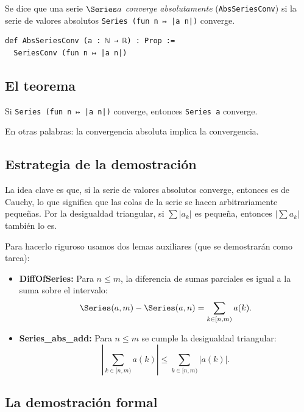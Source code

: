 Se dice que una serie $\Series a$ \emph{converge absolutamente} (\texttt{AbsSeriesConv}) si la serie de valores absolutos \texttt{Series (fun n ↦ |a n|)} converge.

\begin{verbatim}
def AbsSeriesConv (a : ℕ → ℝ) : Prop :=
  SeriesConv (fun n ↦ |a n|)
\end{verbatim}

\subsection{El teorema}

\begin{teorema}
Si \texttt{Series (fun n ↦ |a n|)} converge, entonces \texttt{Series a} converge.
\end{teorema}

En otras palabras: la convergencia absoluta implica la convergencia.

\subsection{Estrategia de la demostración}

La idea clave es que, si la serie de valores absolutos converge, entonces es de Cauchy, lo que significa que las colas de la serie se hacen arbitrariamente pequeñas. Por la desigualdad triangular, si $\sum |a_k|$ es pequeña, entonces $\left|\sum a_k\right|$ también lo es.

Para hacerlo riguroso usamos dos lemas auxiliares (que se demostrarán como tarea):
\begin{itemize}
  \item \textbf{DiffOfSeries:} Para $n \le m$, la diferencia de sumas parciales es igual a la suma sobre el intervalo:
  \[
    \Series(a, m) - \Series(a, n) = \sum_{k \in [n,m)} a(k).
  \]
  \item \textbf{Series\_abs\_add:} Para $n \le m$ se cumple la desigualdad triangular:
  \[
    \left| \sum_{k \in [n,m)} a(k) \right| \le \sum_{k \in [n,m)} |a(k)| .
  \]
\end{itemize}

\subsection{La demostración formal}

